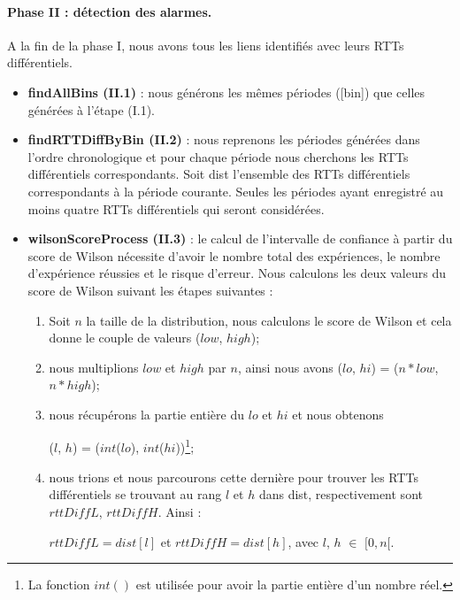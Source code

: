 \paragraph{ Phase II : détection des alarmes.}

A la fin de la phase I, nous avons tous les liens identifiés avec leurs
RTTs différentiels. 

\begin{itemize}
	
	\item \textbf{findAllBins (II.1)} : nous générons les mêmes périodes  ({\color{gray}[bin]}) que celles générées à
	l'étape (I.1).
	\item \textbf{findRTTDiffByBin (II.2)} : nous reprenons les périodes générées dans l'ordre chronologique et
	pour chaque période nous cherchons les RTTs différentiels correspondants. Soit  {\color{gray}dist} l'ensemble des RTTs différentiels correspondants à la période courante.
	Seules les périodes ayant enregistré au moins  quatre RTTs différentiels qui  seront considérées.
	\item \textbf{wilsonScoreProcess (II.3)} : le calcul de l'intervalle de confiance à partir du score de Wilson nécessite d'avoir le nombre total des expériences, le nombre d'expérience réussies et  le risque d'erreur. Nous calculons les deux valeurs du score de Wilson suivant les étapes suivantes :
	
	\begin{enumerate}
		\item Soit $n$ la taille de la distribution, nous calculons le score de Wilson et cela donne le couple de valeurs ($ low $, $ high $);
		\item nous multiplions $ low $ et $ high $ par  $n$, ainsi nous avons ($ lo $, $ hi $) =  ($ n*low $, $ n*high $);
		\item nous récupérons la partie entière du  $ lo $ et $ hi $ et  nous obtenons
		
		($l$, $h$) = ($ int $($ lo $), $ int $($ hi $))\footnote{La fonction $  int() $ est utilisée pour avoir la partie entière d'un nombre réel.};
		\item  nous trions  {\color{gray}{dist}}  et nous parcourons cette dernière pour trouver les RTTs différentiels  se trouvant au rang $  l $ et $ h $ dans {\color{gray}dist}, respectivement sont $ rttDiffL $, $ rttDiffH $. Ainsi :
		
		$ rttDiffL  = dist[l]$  et $ rttDiffH = dist[h]$, avec $l$, $h$ $\in$ $[0,n[$. 
		
	\end{enumerate}
	

\end{itemize}
